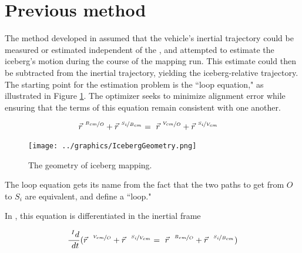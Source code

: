 
\section{Previous method}
The method developed in \cite{Kimball2011b} assumed that the vehicle's inertial trajectory could be measured or estimated independent of the , and attempted to estimate the iceberg's motion during the course of the mapping run. This estimate could then be subtracted from the inertial trajectory, yielding the iceberg-relative trajectory. The starting point for the estimation problem is the ``loop equation," as illustrated in Figure \ref{fig:LoopEquation}. The optimizer seeks to minimize alignment error while ensuring that the terms of this equation remain consistent with one another. 

\begin{align}
\vec{r}^{~\nicefrac{B_{cm}}{O}} + \vec{r}^{~\nicefrac{S_i}{B_{cm}}} &= ~\vec{r}^{~\nicefrac{V_{cm}}{O}} + \vec{r}^{~\nicefrac{S_i}{V_{cm}}}
\label{eqn:BasicLoop}
\end{align}

\begin{figure}[htbp]
   \centering
   \texttt{[image: ../graphics/IcebergGeometry.png]} %
   \caption{The geometry of iceberg mapping. }  
    \label{fig:LoopEquation}
\end{figure}

The loop equation gets its name from the fact that the two paths to get from $O$ to $S_i$ are equivalent, and define a ``loop."

In \cite{Kimball2011b}, this equation is differentiated in the inertial frame

\begin{equation} %
   \frac{~^Id}{~dt}(\vec{r}^{~~\nicefrac{V_{cm}}{O}} + \vec{r}^{~~\nicefrac{S_i}{V_{cm}}} = ~ \vec{r}^{~~\nicefrac{B_{cm}}{O}} + \vec{r}^{~~\nicefrac{S_i}{B_{cm}}})\\
   \end{equation}
   
